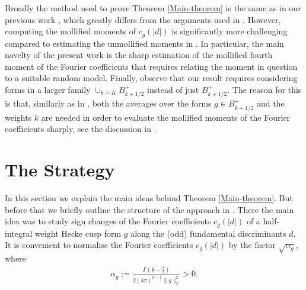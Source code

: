 \documentclass[a4paper,10pt,twoside]{amsart}
\theoremstyle{definition}
\numberwithin{equation}{section}
\renewcommand\:{\colon}
\begin{document}
Broadly the method used to prove Theorem \ref{Main-theorem} is the same as in our previous work \cite{Jaasaari2026}, which greatly differs from the arguments used in \cite{Ghosh-Sarnak2012, Matomaki2016, Lester-Matomaki-Radziwill2018}. However, computing the mollified moments of $c_g(|d|)$ is significantly more challenging compared to estimating the unmollified moments in \cite{Jaasaari2026}. In particular, the main novelty of the present work is the sharp estimation of the mollified fourth moment of the Fourier coefficients that requires relating the moment in question to a suitable random model. Finally, observe that our result requires considering forms in a larger family $\cup_{k\sim K}B_{k+1/2}^+$ instead of just $B_{k+1/2}^+$. The reason for this is that, similarly as in \cite{Jaasaari2026}, both the averages over the forms $g\in B_{k+1/2}^+$ and the weights $k$ are needed in order to evaluate the mollified moments of the Fourier coefficients sharply, see the discussion in \cite[Section 2]{Jaasaari2026}. 

\section{The Strategy}

\noindent In this section we explain the main ideas behind Theorem \ref{Main-theorem}. But before that we briefly outline the structure of the approach in \cite{Jaasaari2026}. There the main idea was to study sign changes of the Fourier coefficients $c_g(|d|)$ of a half-integral weight Hecke cusp form $g$ along the (odd) fundamental discriminants $d$. It is convenient to normalise the Fourier coefficients $c_g(|d|)$ by the factor $\sqrt{\alpha_g}$, where
\begin{align}\label{Normalisation}
\alpha_g:=\frac{\Gamma\left(k-\frac12\right)}{2(4\pi)^{k-\frac12}\|g\|_2^2}>0.
\end{align}
\end{document}
